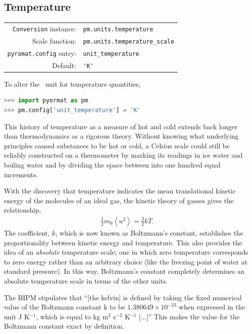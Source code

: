 \subsection{Temperature}\label{sec:units:temperature}

\begin{tabular}{rl}
\hline
\verb|Conversion| instance: & \verb|pm.units.temperature|\\
Scale function: & \verb|pm.units.temperature_scale|\\
\verb|pyromat.config| entry: & \verb|unit_temperature|\\
Default: & \verb|'K'|\\
\hline
\end{tabular}
\vspace{1em}

To alter the \PM\ unit for temperature quantities,
\begin{lstlisting}[language=Python]
>>> import pyormat as pm
>>> pm.config['unit_temperature'] = 'K'
\end{lstlisting}

This history of temperature as a measure of hot and cold extends back longer than thermodynamics as a rigorous theory.  Without knowing what underlying principles caused substances to be hot or cold, a Celsius scale could still be reliably constructed on a thermometer by marking its readings in ice water and boiling water and by dividing the space between into one hundred equal increments. 

With the discovery that temperature indicates the mean translational kinetic energy of the molecules of an ideal gas, the kinetic theory of gasses gives the relationship,
\begin{align}
\frac{1}{2} m_0 \left< u^2 \right> = \frac{3}{2} k T.
\end{align}
The coefficient, $k$, which is now known as Boltzmann's constant, establishes the proportionality between kinetic energy and temperature.  This also provides the idea of an \emph{absolute} temperature scale; one in which zero temperature corresponds to zero energy rather than an arbitrary choice (like the freezing point of water at standard pressure).  In this way, Boltzmann's constant completely determines an absolute temperature scale in terms of the other units.

The BIPM stipulates that ``[the kelvin] is defined by taking the fixed numerical value of the Boltzmann constant k to be $1.380 649 \times 10^{-23}$ when expressed in the unit J K$^{-1}$, which is equal to kg m$^2$ s$^{-2}$ K$^{-1}$ [...]''\cite[p.133]{si:2019}  This makes the value for the Boltzmann constant exact by definition.

